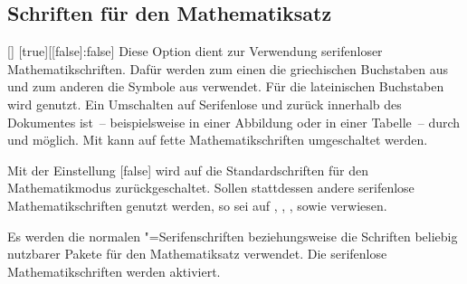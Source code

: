 \begin{Declaration}{}
\end{Declaration}

\subsection{Schriften für den Mathematiksatz}
\begin{Declaration}{[\PBoolean]}%
  [true][[false]:false]
\printdeclarationlist%
\label{sec:math}
%
Diese Option dient zur Verwendung serifenloser Mathematikschriften. Dafür 
werden zum einen die griechischen Buchstaben aus  und zum 
anderen die Symbole aus  verwendet. Für die lateinischen 
Buchstaben wird \Univers genutzt. Ein Umschalten auf Serifenlose und zurück 
innerhalb des Dokumentes ist~-- beispielsweise in einer Abbildung oder in einer 
Tabelle~-- durch  und 
 möglich. Mit
 kann auf fette Mathematikschriften umgeschaltet werden.

Mit der Einstellung [false] wird auf die Standardschriften
für den Mathematikmodus zurückgeschaltet. Sollen stattdessen andere serifenlose 
Mathematikschriften genutzt werden, so sei auf , 
, ,  sowie 
 verwiesen.
%
\begin{values}
\itemfalse
  Es werden die normalen "=Serifenschriften beziehungsweise die 
  Schriften beliebig nutzbarer Pakete für den Mathematiksatz verwendet.
\itemtrue*
  Die serifenlose Mathematikschriften werden aktiviert.
\end{values}
\end{Declaration}

